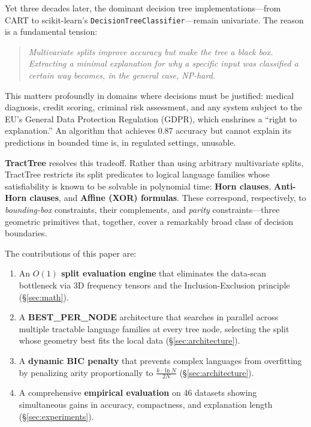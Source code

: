 \documentclass[11pt,a4paper]{article}
\begin{document}
Yet three decades later, the dominant decision tree implementations---from CART to scikit-learn's \texttt{DecisionTreeClassifier}---remain univariate. The reason is a fundamental tension:

\begin{quote}
\textit{Multivariate splits improve accuracy but make the tree a black box. Extracting a minimal explanation for why a specific input was classified a certain way becomes, in the general case, NP-hard.}
\end{quote}

This matters profoundly in domains where decisions must be justified: medical diagnosis, credit scoring, criminal risk assessment, and any system subject to the EU's General Data Protection Regulation (GDPR), which enshrines a ``right to explanation.'' An algorithm that achieves $0.87$ accuracy but cannot explain its predictions in bounded time is, in regulated settings, unusable.

\textbf{TractTree} resolves this tradeoff. Rather than using arbitrary multivariate splits, TractTree restricts its split predicates to logical language families whose satisfiability is known to be solvable in polynomial time: \textbf{Horn clauses}, \textbf{Anti-Horn clauses}, and \textbf{Affine (XOR) formulas}. These correspond, respectively, to \emph{bounding-box} constraints, their complements, and \emph{parity} constraints---three geometric primitives that, together, cover a remarkably broad class of decision boundaries.

The contributions of this paper are:

\begin{enumerate}[leftmargin=2em]
    \item An \textbf{$O(1)$ split evaluation engine} that eliminates the data-scan bottleneck via 3D frequency tensors and the Inclusion-Exclusion principle (\S\ref{sec:math}).
    \item A \textbf{BEST\_PER\_NODE} architecture that searches in parallel across multiple tractable language families at every tree node, selecting the split whose geometry best fits the local data (\S\ref{sec:architecture}).
    \item A \textbf{dynamic BIC penalty} that prevents complex languages from overfitting by penalizing arity proportionally to $\frac{k \cdot \ln N}{2N}$ (\S\ref{sec:architecture}).
    \item A comprehensive \textbf{empirical evaluation} on 46 datasets showing simultaneous gains in accuracy, compactness, and explanation length (\S\ref{sec:experiments}).
\end{enumerate}
\end{document}
